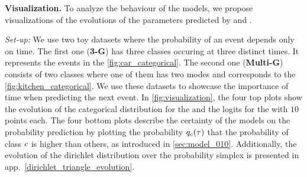 \textbf{Visualization.} To analyze the behaviour of the models, we propose visualizations of the evolutions of the parameters predicted by \DirModel and \GPModel.

\textit{Set-up:} We use two toy datasets where the probability of an event depends only on time. The first one (\textbf{3-G}) has three classes occuring at three distinct times. It represents the events in the \cref{fig:car_categorical}. The second one (\textbf{Multi-G}) consists of two classes where one of them has two modes and corresponds to the \cref{fig:kitchen_categorical}. We use these datasets to showcase the importance of time when predicting the next event. In \cref{fig:visualization}, the four top plots show the evolution of the categorical distribution for the \DirModel and the logits for the \GPModel with $10$ points each. The four bottom plots describe the certainty of the models on the probability prediction by plotting the probability $q_c(\tau)$ that the probability of class $c$ is higher than others, as introduced in \cref{sec:model_010}.
Additionally, the evolution of the dirichlet distribution over the probability simplex is presented in app.~\ref{dirichlet_triangle_evolution}.

